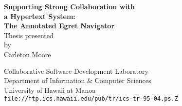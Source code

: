 



\newcommand{\horizontalline} {\rule{\textwidth}{.02in}} 
\pagestyle{empty}




\newenvironment{tenurelist}{\begin{enumerate}%
                            \setcounter{enumi}{\thetenurecite}%
                            \def\labelenumi{\theenumi. }}
                           {\setcounter{tenurecite}{\theenumi}%
                            \end{enumerate}}


      

\begin{slide} \Huge 
 \begin{center} 
   {\bf Supporting Strong Collaboration with\\
   a Hypertext System:\\ 
   The Annotated Egret Navigator}\\

   \vspace{0.5in} 
   Thesis presented\\
   by\\ 
   Carleton Moore\\
   \vspace{0.5in} 
    
   Collaborative Software Development Laboratory \\ 
   Department of Information \& Computer Sciences\\ 
   University of Hawaii at Manoa \\
   \vspace{0.1in}
   \LARGE
   {\tt file://ftp.ics.hawaii.edu/pub/tr/ics-tr-95-04.ps.Z}
 \end{center} 
\end{slide} \Huge   

